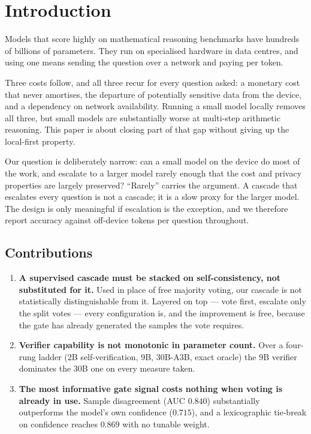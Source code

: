 \documentclass[conference]{IEEEtran}
\begin{document}
\section{Introduction}

Models that score highly on mathematical reasoning benchmarks have hundreds of billions
of parameters. They run on specialised hardware in data centres, and using one means
sending the question over a network and paying per token.

Three costs follow, and all three recur for every question asked: a monetary cost that
never amortises, the departure of potentially sensitive data from the device, and a
dependency on network availability. Running a small model locally removes all three, but
small models are substantially worse at multi-step arithmetic reasoning. This paper is
about closing part of that gap without giving up the local-first property.

Our question is deliberately narrow: can a small model on the device do most of the work,
and escalate to a larger model rarely enough that the cost and privacy properties are
largely preserved? ``Rarely'' carries the argument. A cascade that escalates every
question is not a cascade; it is a slow proxy for the larger model. The design is only
meaningful if escalation is the exception, and we therefore report accuracy against
off-device tokens per question throughout.

\subsection{Contributions}

\begin{enumerate}
\item \textbf{A supervised cascade must be stacked on self-consistency, not substituted
for it.} Used in place of free majority voting, our cascade is not statistically
distinguishable from it. Layered on top --- vote first, escalate only the split votes ---
every configuration is, and the improvement is free, because the gate has already
generated the samples the vote requires.
\item \textbf{Verifier capability is not monotonic in parameter count.} Over a four-rung
ladder (2B self-verification, 9B, 30B-A3B, exact oracle) the 9B verifier dominates the
30B one on every measure taken.
\item \textbf{The most informative gate signal costs nothing when voting is already in
use.} Sample disagreement (AUC $0.840$) substantially outperforms the model's own
confidence ($0.715$), and a lexicographic tie-break on confidence reaches $0.869$ with no
tunable weight.
\end{enumerate}
\end{document}
